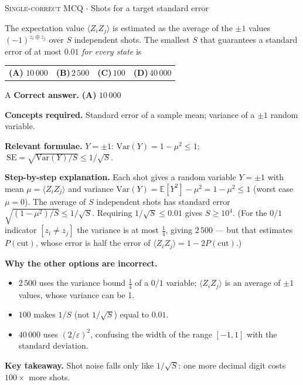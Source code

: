 \documentclass[11pt,a4paper]{article}
\newcommand{\optlabel}[1]{\textbf{(#1)}}
\newcommand{\correctlabel}[1]{\textcolor{okgreen}{\textbf{(#1)}\,\ding{51}}}
\newenvironment{qitem}[1]{\begin{list}{}{\setlength{\leftmargin}{3.3em}\setlength{\labelwidth}{3.1em}%
  \setlength{\labelsep}{0.2em}\setlength{\topsep}{3pt}\setlength{\parsep}{3pt}}\item[\textbf{Q.#1}\hfill]}{\end{list}}
\newcommand{\qsep}{\par\vspace{2pt}{\color{black!15}\hrule}\vspace{4pt}}
\newcommand{\qmeta}[2]{{\footnotesize\color{black!60}\textsc{#1} \;$\cdot$\; #2}\par}
\begin{document}
\begin{qitem}{12}
\qmeta{Single-correct MCQ}{Shots for a target standard error}
The expectation value $\langle Z_iZ_j\rangle$ is estimated as the average of the $\pm1$ values $(-1)^{z_i \oplus z_j}$ over
$S$ independent shots. The smallest $S$ that guarantees a standard error of at most $0.01$ \emph{for every state} is
\par\smallskip\noindent\begin{tabularx}{\linewidth}{@{}*{4}{L}@{}}
\correctlabel{A}\,$10\,000$ & \optlabel{B}\,$2\,500$ & \optlabel{C}\,$100$ & \optlabel{D}\,$40\,000$
\end{tabularx}
\end{qitem}
\begin{solbox}{A}
\textbf{\color{brand}Correct answer.} \textcolor{okgreen}{\textbf{(A)}} $10\,000$

\textbf{\color{brand}Concepts required.} Standard error of a sample mean; variance of a $\pm1$ random variable.

\textbf{\color{brand}Relevant formulae.} $Y = \pm1$: $\mathrm{Var}(Y) = 1 - \mu^2 \le 1$; $\ \mathrm{SE} = \sqrt{\mathrm{Var}(Y)/S} \le 1/\sqrt S$.

\textbf{\color{brand}Step-by-step explanation.} Each shot gives a random variable $Y = \pm1$ with mean $\mu = \langle Z_iZ_j\rangle$ and variance
$\mathrm{Var}(Y) = \mathbb{E}[Y^2] - \mu^2 = 1 - \mu^2 \le 1$ (worst case $\mu = 0$). The average of $S$ independent shots has
standard error $\sqrt{(1-\mu^2)/S} \le 1/\sqrt S$. Requiring $1/\sqrt S \le 0.01$ gives $S \ge 10^4$.
(For the $0/1$ indicator $[z_i \neq z_j]$ the variance is at most $\tfrac14$, giving $2\,500$ --- but that estimates
$P(\text{cut})$, whose error is half the error of $\langle Z_iZ_j\rangle = 1 - 2P(\text{cut})$.)

\textbf{\color{brand}Why the other options are incorrect.}
\begin{itemize}[leftmargin=2.4em, itemsep=1pt, topsep=2pt]
\item[\textbf{(B)}] $2\,500$ uses the variance bound $\frac14$ of a $0/1$ variable; $\langle Z_iZ_j\rangle$ is an average of $\pm1$ values, whose variance can be 1.
\item[\textbf{(C)}] $100$ makes $1/S$ (not $1/\sqrt S$) equal to $0.01$.
\item[\textbf{(D)}] $40\,000$ uses $(2/\varepsilon)^2$, confusing the width of the range $[-1, 1]$ with the standard deviation.
\end{itemize}
\textbf{\color{brand}Key takeaway.} Shot noise falls only like $1/\sqrt S$: one more decimal digit costs $100\times$ more shots.
\end{solbox}
\qsep
\end{document}

